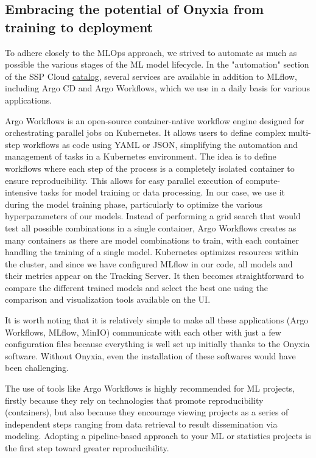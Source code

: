 \subsection{Embracing the potential of Onyxia from training to deployment}

To adhere closely to the MLOps approach, we strived to automate as much as possible the various stages of the ML model lifecycle. In the "automation" section of the SSP Cloud \href{https://datalab.sspcloud.fr/catalog/automation}{catalog}, several services are available in addition to MLflow, including Argo CD and Argo Workflows, which we use in a daily basis for various applications.

Argo Workflows is an open-source container-native workflow engine designed for orchestrating parallel jobs on Kubernetes. It allows users to define complex multi-step workflows as code using YAML or JSON, simplifying the automation and management of tasks in a Kubernetes environment. The idea is to define workflows where each step of the process is a completely isolated container to ensure reproducibility. This allows for easy parallel execution of compute-intensive tasks for model training or data processing. In our case, we use it during the model training phase, particularly to optimize the various hyperparameters of our models. Instead of performing a grid search that would test all possible combinations in a single container, Argo Workflows creates as many containers as there are model combinations to train, with each container handling the training of a single model. Kubernetes optimizes resources within the cluster, and since we have configured MLflow in our code, all models and their metrics appear on the Tracking Server. It then becomes straightforward to compare the different trained models and select the best one using the comparison and visualization tools available on the UI. 

It is worth noting that it is relatively simple to make all these applications (Argo Workflows, MLflow, MinIO) communicate with each other with just a few configuration files because everything is well set up initially thanks to the Onyxia software. Without Onyxia, even the installation of these softwares would have been challenging.

The use of tools like Argo Workflows is highly recommended for ML projects, firstly because they rely on technologies that promote reproducibility (containers), but also because they encourage viewing projects as a series of independent steps ranging from data retrieval to result dissemination via modeling. Adopting a pipeline-based approach to your ML or statistics projects is the first step toward greater reproducibility.

